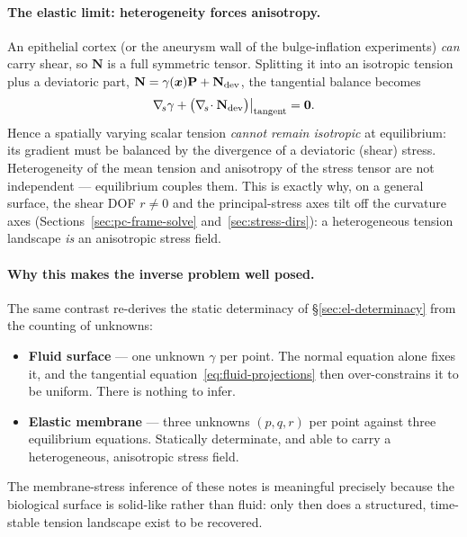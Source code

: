 \documentclass[11pt]{article}
\newcommand{\vv}[1]{\bm{#1}}          %
\newcommand{\Nb}{\mathbf{N}}           %
\newcommand{\divs}{\nabla_{\!s}\!\cdot}
\begin{document}
\paragraph{The elastic limit: heterogeneity forces anisotropy.}
An epithelial cortex (or the aneurysm wall of the bulge-inflation experiments)
\emph{can} carry shear, so $\Nb$ is a full symmetric tensor.  Splitting it into
an isotropic tension plus a deviatoric part, $\Nb=\gamma(\vv x)\mathbf P+\Nb_{\rm
dev}$, the tangential balance becomes
\begin{equation}
  \nabla_{\!s}\gamma + \bigl(\divs\Nb_{\rm dev}\bigr)\big|_{\rm tangent} = \vv0 .
  \label{eq:het-forces-aniso}
\end{equation}
Hence a spatially varying scalar tension \emph{cannot remain isotropic} at
equilibrium: its gradient must be balanced by the divergence of a deviatoric
(shear) stress.  Heterogeneity of the mean tension and anisotropy of the stress
tensor are not independent --- equilibrium couples them.  This is exactly why,
on a general surface, the shear DOF $r\ne0$ and the principal-stress axes tilt
off the curvature axes (Sections~\ref{sec:pc-frame-solve}
and~\ref{sec:stress-dirs}): a heterogeneous tension landscape \emph{is} an
anisotropic stress field.

\paragraph{Why this makes the inverse problem well posed.}
The same contrast re-derives the static determinacy of
\S\ref{sec:el-determinacy} from the counting of unknowns:
\begin{itemize}[nosep]
  \item \textbf{Fluid surface} --- one unknown $\gamma$ per point.  The normal
        equation alone fixes it, and the tangential
        equation~\eqref{eq:fluid-projections} then over-constrains it to be
        uniform.  There is nothing to infer.
  \item \textbf{Elastic membrane} --- three unknowns $(p,q,r)$ per point against
        three equilibrium equations.  Statically determinate, and able to carry a
        heterogeneous, anisotropic stress field.
\end{itemize}
The membrane-stress inference of these notes is meaningful precisely because the
biological surface is solid-like rather than fluid: only then does a structured,
time-stable tension landscape exist to be recovered.

\end{document}
